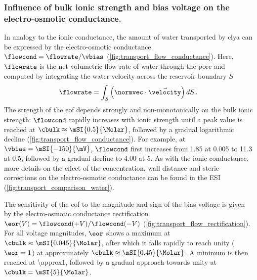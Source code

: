 \subsubsection{Influence of bulk ionic strength and bias voltage on the electro-osmotic conductance.}
%
In analogy to the ionic conductance, the amount of water transported by \gls{clya} can be expressed by the
electro-osmotic conductance $\flowcond = \flowrate / \vbias$ (\cref{fig:transport_flow_conductance}). Here,
$\flowrate$ is the net volumetric flow rate of water through the pore and computed by integrating the water
velocity across the reservoir boundary $S$
%
\begin{align}\label{eq:flowrate}
  \flowrate = \int_{S}\left(\normvec\cdot\vec{\velocity}\right)dS
  \text{\,.}
\end{align}
%
The strength of the \gls{eof} depends strongly and non-monotonically on the bulk ionic strength: $\flowcond$
rapidly increases with ionic strength until a peak value is reached at $\cbulk \approx \mSI{0.5}{\Molar}$,
followed by a gradual logarithmic decline (\cref{fig:transport_flow_conductance}). For example, at $\vbias =
\mSI{-150}{\mV}$, $\flowcond$ first increases from \SI{1.85}{\cnmpnspv} at \SI{0.005}{\Molar} to
\SI{11.3}{\cnmpnspv} at \SI{0.5}{\Molar}, followed by a gradual decline to \SI{4.00}{\cnmpnspv} at
\SI{5}{\Molar}. As with the ionic conductance, more details on the effect of the concentration, wall distance
and steric corrections on the electro-osmotic conductance can be found in the ESI
(\cref{fig:transport_comparison_water}).

The sensitivity of the \gls{eof} to the magnitude and sign of the bias voltage is given by the electro-osmotic
conductance rectification $\eor(V) = \flowcond (+V) / \flowcond (-V)$
(\cref{fig:transport_flow_rectification}). For all voltage magnitudes, $\eor$ shows a maximum at $\cbulk
\approx \mSI{0.045}{\Molar}$, after which it falls rapidly to reach unity ($\eor = 1$) at approximately
$\cbulk \approx \mSI{0.45}{\Molar}$. A minimum is then reached at \SI{\approx1}{\Molar}, followed by a gradual
approach towards unity at $\cbulk = \mSI{5}{\Molar}$.

